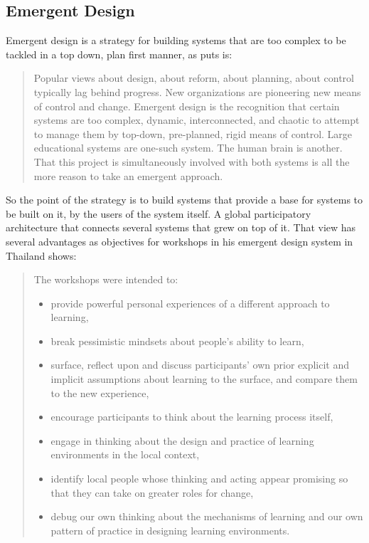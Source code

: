 \subsection{Emergent Design}

Emergent design is a strategy for building systems that are too complex to be
tackled in a top down, plan first manner, as
\cite{education:cavallo__technological_fluency} puts is:
\begin{quotation}
Popular views about design, about reform, about planning, about control
typically lag behind progress. New organizations are pioneering new means of
control and change.  Emergent design is the recognition that certain systems are
too complex, dynamic, interconnected, and chaotic to attempt to manage them by
top-down, pre-planned, rigid means of control. Large educational systems are
one-such system. The human brain is another.  That this project is
simultaneously involved with both systems is all the more reason to take an
emergent approach.
\end{quotation}

So the point of the strategy is to build systems that provide a base for systems
to be built on it, by the users of the system itself. A global participatory architecture
that connects several systems that grew on top of it. That view has several
advantages as \cite{education:cavallo__technological_fluency} objectives for workshops in his emergent design system in
Thailand shows:

\begin{quote}
  The workshops were intended to:
  \begin{itemize}

 \item provide powerful personal
experiences of a different approach to learning,

 \item break pessimistic mindsets about people’s ability to learn,

 \item surface, reflect upon and discuss participants’ own prior explicit and
 implicit assumptions about learning to the surface, and compare them to the new
 experience,

 \item encourage participants to think about the learning process itself,

 \item engage in thinking about the design and practice of learning environments
 in the local context,

 \item identify local people whose thinking and acting appear promising so that
 they can take on greater roles for change,

 \item debug our own thinking about the mechanisms of learning and our own
 pattern of practice in designing learning environments.  

 \end{itemize}
\end{quote}


